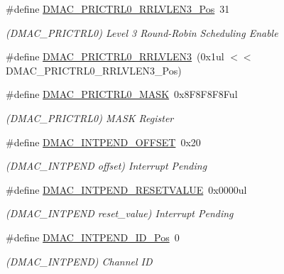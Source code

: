 \begin{DoxyCompactItemize}
\item 
\#define \mbox{\hyperlink{group___s_a_m_d21___d_m_a_c_gaf3ada4bf03e701bedbec0f9ea0b26548}{D\+M\+A\+C\+\_\+\+P\+R\+I\+C\+T\+R\+L0\+\_\+\+R\+R\+L\+V\+L\+E\+N3\+\_\+\+Pos}}~31
\begin{DoxyCompactList}\small\item\em (D\+M\+A\+C\+\_\+\+P\+R\+I\+C\+T\+R\+L0) Level 3 Round-\/\+Robin Scheduling Enable \end{DoxyCompactList}\item 
\#define \mbox{\hyperlink{group___s_a_m_d21___d_m_a_c_ga3e023afbcc4555947c52d7352fed88bf}{D\+M\+A\+C\+\_\+\+P\+R\+I\+C\+T\+R\+L0\+\_\+\+R\+R\+L\+V\+L\+E\+N3}}~(0x1ul $<$$<$ D\+M\+A\+C\+\_\+\+P\+R\+I\+C\+T\+R\+L0\+\_\+\+R\+R\+L\+V\+L\+E\+N3\+\_\+\+Pos)
\item 
\#define \mbox{\hyperlink{group___s_a_m_d21___d_m_a_c_ga41dd468fc48dfb17c9cce32007da8b4c}{D\+M\+A\+C\+\_\+\+P\+R\+I\+C\+T\+R\+L0\+\_\+\+M\+A\+SK}}~0x8\+F8\+F8\+F8\+Ful
\begin{DoxyCompactList}\small\item\em (D\+M\+A\+C\+\_\+\+P\+R\+I\+C\+T\+R\+L0) M\+A\+SK Register \end{DoxyCompactList}\item 
\#define \mbox{\hyperlink{group___s_a_m_d21___d_m_a_c_ga6a086878ea099fa86d50f9af7274fc15}{D\+M\+A\+C\+\_\+\+I\+N\+T\+P\+E\+N\+D\+\_\+\+O\+F\+F\+S\+ET}}~0x20
\begin{DoxyCompactList}\small\item\em (D\+M\+A\+C\+\_\+\+I\+N\+T\+P\+E\+ND offset) Interrupt Pending \end{DoxyCompactList}\item 
\#define \mbox{\hyperlink{group___s_a_m_d21___d_m_a_c_gadf4518105b2b9f4ee022dcc22dd0296f}{D\+M\+A\+C\+\_\+\+I\+N\+T\+P\+E\+N\+D\+\_\+\+R\+E\+S\+E\+T\+V\+A\+L\+UE}}~0x0000ul
\begin{DoxyCompactList}\small\item\em (D\+M\+A\+C\+\_\+\+I\+N\+T\+P\+E\+ND reset\+\_\+value) Interrupt Pending \end{DoxyCompactList}\item 
\#define \mbox{\hyperlink{group___s_a_m_d21___d_m_a_c_ga725ca18c42f6b625eec02028ff6f7f3a}{D\+M\+A\+C\+\_\+\+I\+N\+T\+P\+E\+N\+D\+\_\+\+I\+D\+\_\+\+Pos}}~0
\begin{DoxyCompactList}\small\item\em (D\+M\+A\+C\+\_\+\+I\+N\+T\+P\+E\+ND) Channel ID \end{DoxyCompactList}\item 
$$
\end{DoxyCompactItemize}
